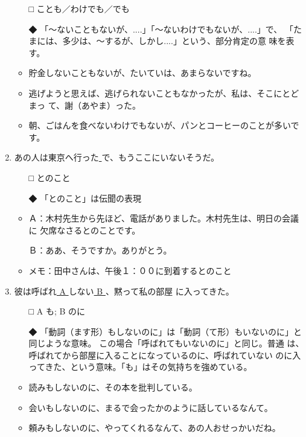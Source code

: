 \documentclass[
uplatex,
b5paper,
10pt,
dvipdfmx
]{jsbook}
\begin{document}
\begin{enumerate}
\begin{itemize}
\item[□] ことも／わけでも／でも
\item[◆] 「〜ないこともないが、....」「〜ないわけでもないが、....」で、
	  「たまには、多少は、〜するが、しかし....」という、部分肯定の意
	  味を表す。
\end{itemize}
\begin{itemize}
\item 貯金しないこともないが、たいていは、あまらないですね。
\item 逃げようと思えば、逃げられないこともなかったが、私は、そこにとどまっ
      て、謝（あやま）った。
\item 朝、ごはんを食べないわけでもないが、パンとコーヒーのことが多いです。
\end{itemize}


\item あの人は東京へ行った\underline{   }で、もうここにいないそうだ。
\begin{itemize}
\item[□] とのこと
\item[◆] 「とのこと」は伝聞の表現
\end{itemize}
\begin{itemize}
\item Ａ：木村先生から先ほど、電話がありました。木村先生は、明日の会議に
      欠席なさるとのことです。

      Ｂ：ああ、そうですか。ありがとう。

\item メモ：田中さんは、午後１：００に到着するとのこと
\end{itemize}

\item 彼は呼ばれ\underline{ A }しない\underline{ B }、黙って私の部屋
      に入ってきた。
\begin{itemize}
\item[□] A も; B のに
\item[◆] 「動詞（ます形）もしないのに」は「動詞（て形）もいないのに」と
	  同じような意味。 この場合「呼ばれてもいないのに」と同じ。普通
	  は、呼ばれてから部屋に入ることになっているのに、呼ばれていない
	  のに入ってきた、という意味。「も」はその気持ちを強めている。
\end{itemize}
\begin{itemize}
\item 読みもしないのに、その本を批判している。
\item 会いもしないのに、まるで会ったかのように話しているなんて。
\item 頼みもしないのに、やってくれるなんて、あの人おせっかいだね。
\end{itemize}



\end{enumerate}
\end{document}
